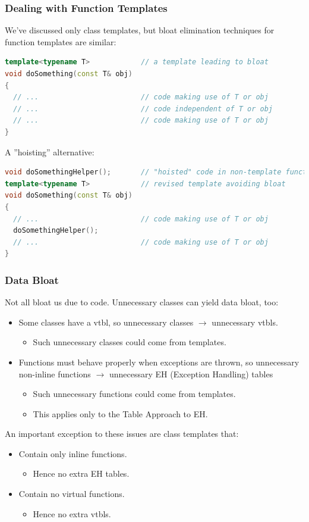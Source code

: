 \subsubsection{Dealing with Function Templates}
We've discussed only class templates, but bloat elimination techniques for function templates are similar:
\begin{lstlisting}[language=C++]
template<typename T>            // a template leading to bloat
void doSomething(const T& obj)
{
  // ...                        // code making use of T or obj
  // ...                        // code independent of T or obj
  // ...                        // code making use of T or obj
}
\end{lstlisting}
A ''hoisting'' alternative:
\begin{lstlisting}[language=C++]
void doSomethingHelper();       // "hoisted" code in non-template function; not inline
template<typename T>            // revised template avoiding bloat
void doSomething(const T& obj)
{
  // ...                        // code making use of T or obj
  doSomethingHelper();
  // ...                        // code making use of T or obj
}
\end{lstlisting}

\subsubsection{Data Bloat}
Not all bloat us due to code. Unnecessary classes can yield data bloat, too:
\begin{itemize}
  \item Some classes have a vtbl, so unnecessary classes $\rightarrow$ unnecessary vtbls.
  \begin{itemize}
    \item Such unnecessary classes could come from templates.
  \end{itemize}
  \item Functions must behave properly when exceptions are thrown, so unnecessary non-inline functions $\rightarrow$ unnecessary EH (Exception Handling) tables
  \begin{itemize}
    \item Such unnecessary functions could come from templates.
    \item This applies only to the Table Approach to EH.
  \end{itemize}
\end{itemize}
An important exception to these issues are class templates that:
\begin{itemize}
  \item Contain only inline functions.
  \begin{itemize}
    \item Hence no extra EH tables.
  \end{itemize}
  \item Contain no virtual functions.
  \begin{itemize}
    \item Hence no extra vtbls.
  \end{itemize}
\end{itemize}

